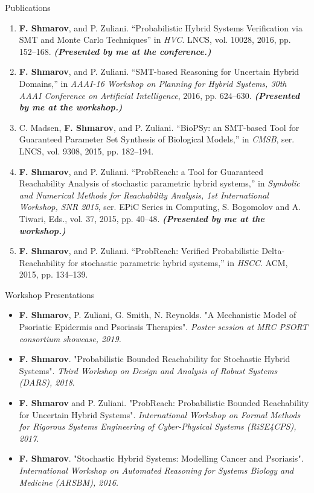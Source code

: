 \documentclass{resume} %
\begin{document}
\begin{rSection}{Publications}
\begin{enumerate}[resume]
	\item {\bf F. Shmarov}, and P. Zuliani. ``Probabilistic Hybrid Systems Verification via 
	SMT and Monte Carlo Techniques'' in {\em HVC}. LNCS, vol. 10028, 2016, pp. 152--168. 
	{\bf {\em (Presented by me at the conference.)}}

	\item {\bf F. Shmarov}, and P. Zuliani. ``SMT-based Reasoning for Uncertain Hybrid Domains,'' 
	in {\em AAAI-16 Workshop on Planning for Hybrid Systems, 
	30th AAAI Conference on Artificial Intelligence}, 2016, pp. 624--630.
	{\bf {\em (Presented by me at the workshop.)}}

	\item C. Madsen, {\bf F. Shmarov}, and P. Zuliani. ``BioPSy: an SMT-based Tool for 
	Guaranteed Parameter Set Synthesis of Biological Models,'' in {\em CMSB},
	ser. LNCS, vol. 9308, 2015, pp. 182--194.

	\item {\bf F. Shmarov}, and P. Zuliani. ``ProbReach: a Tool for 
	Guaranteed Reachability Analysis of stochastic parametric hybrid systems,''
	in {\em Symbolic and Numerical Methods for Reachability Analysis, 1st International Workshop, SNR 2015}, 
	ser. EPiC Series in Computing, S. Bogomolov and A. Tiwari, Eds., vol. 37, 2015, pp. 40--48.
	{\bf {\em (Presented by me at the workshop.)}}

	\item {\bf F. Shmarov}, and P. Zuliani. ``ProbReach: Verified Probabilistic 
	Delta-Reachability for stochastic parametric hybrid systems,''
	in {\em HSCC}. ACM, 2015, pp. 134--139.
\end{enumerate}
\end{rSection}


\begin{rSection}{Workshop Presentations}
\begin{itemize}

	\item {\bf F. Shmarov}, P. Zuliani, G. Smith, N. Reynolds. "A Mechanistic Model of Psoriatic
	Epidermis and Psoriasis Therapies". {\em Poster session at MRC PSORT consortium showcase, 2019.}

	\item {\bf F. Shmarov}. "Probabilistic Bounded Reachability for Stochastic Hybrid Systems". 
	{\em Third Workshop on Design and Analysis of Robust Systems (DARS), 2018}.

	\item {\bf F. Shmarov} and P. Zuliani. "ProbReach: Probabilistic Bounded 
	Reachability for Uncertain Hybrid Systems". {\em International Workshop on
	Formal Methods for Rigorous Systems Engineering of Cyber-Physical Systems (RiSE4CPS), 2017}.

	\item {\bf F. Shmarov}. "Stochastic Hybrid Systems: Modelling Cancer and Psoriasis". 
	{\em International Workshop on Automated Reasoning for Systems Biology and Medicine (ARSBM), 2016.}

\end{itemize}	
\end{rSection}
\end{document}
